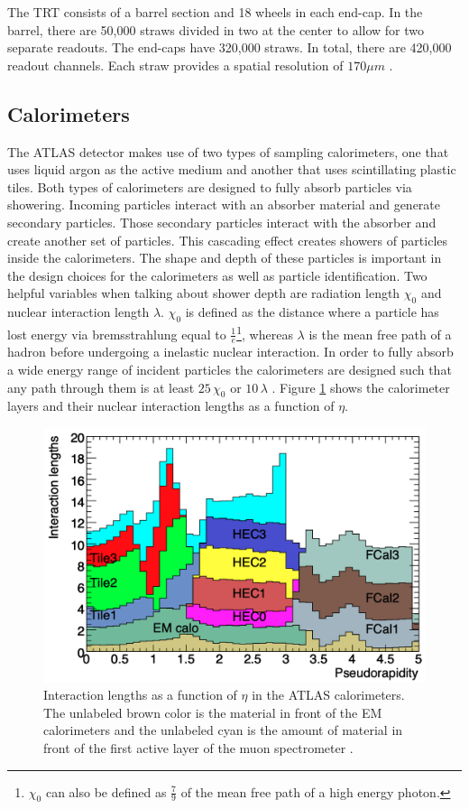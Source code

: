 			The \gls{TRT} consists of a barrel section and 18 wheels in each end-cap. In the barrel, there are 50,000 straws divided in two at the center to allow for two separate readouts. The end-caps have 320,000 straws. In total, there are 420,000 readout channels. Each straw provides a spatial resolution of $170 \mu m$ \cite{ATLAS-ID}.

	\subsection{Calorimeters}\label{ssec:calorimeters}
		The ATLAS detector makes use of two types of sampling calorimeters, one that uses liquid argon as the active medium and another that uses scintillating plastic tiles. Both types of calorimeters are designed to fully absorb particles via showering. Incoming particles interact with an absorber material and generate secondary particles. Those secondary particles interact with the absorber and create another set of particles. This cascading effect creates showers of particles inside the calorimeters. The shape and depth of these particles is important in the design choices for the calorimeters as well as particle identification. Two helpful variables when talking about shower depth are radiation length $\chi_0$ and nuclear interaction length $\lambda$. $\chi_0$ is defined as the distance where a particle has lost energy via bremsstrahlung equal to $\frac{1}{e}$\footnote{$\chi_0$ can also be defined as $\frac{7}{9}$ of the mean free path of a high energy photon.}, whereas $\lambda$ is the mean free path of a hadron before undergoing a inelastic nuclear interaction. In order to fully absorb a wide energy range of incident particles the calorimeters are designed such that any path through them is at least $25 \, \chi_0$ or $10 \, \lambda$ \cites{LAr-TDR}{ATLAS-tile}. Figure \ref{fig:calo-interaction-length} shows the calorimeter layers and their nuclear interaction lengths as a function of $\eta$.

		\begin{figure}[!ht]
		\centering
		\includegraphics[width=.65\textwidth,keepaspectratio=true]{chapters/chapter3_experiment/images/Calo_Interaction_Lengths.png}
		\caption{ Interaction lengths as a function of $\eta$ in the \gls{ATLAS} calorimeters. The unlabeled brown color is the material in front of the EM calorimeters and the unlabeled cyan is the amount of material in front of the first active layer of the muon spectrometer \cite{atlas-experiment}.}
		\label{fig:calo-interaction-length}
		\end{figure}

